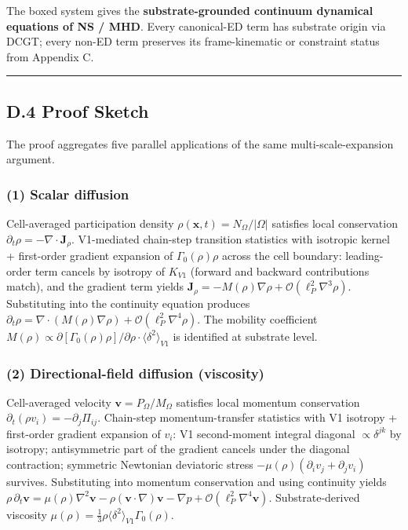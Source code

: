\documentclass[
  11pt,a4paper]{article}
\begin{document}
The boxed system gives the \textbf{substrate-grounded continuum
dynamical equations of NS / MHD}. Every canonical-ED term has substrate
origin via DCGT; every non-ED term preserves its frame-kinematic or
constraint status from Appendix C.

\begin{center}\rule{0.5\linewidth}{0.5pt}\end{center}

\subsection{D.4 Proof Sketch}\label{d.4-proof-sketch}

The proof aggregates five parallel applications of the same
multi-scale-expansion argument.

\subsubsection{(1) Scalar diffusion}\label{scalar-diffusion}

Cell-averaged participation density
\(\rho(\mathbf{x},t) = N_\Omega/|\Omega|\) satisfies local conservation
\(\partial_t\rho = -\nabla\cdot\mathbf{J}_\rho\). V1-mediated chain-step
transition statistics with isotropic kernel + first-order gradient
expansion of \(\Gamma_0(\rho)\rho\) across the cell boundary:
leading-order term cancels by isotropy of \(K_{V1}\) (forward and
backward contributions match), and the gradient term yields
\(\mathbf{J}_\rho = -M(\rho)\nabla\rho + \mathcal{O}(\ell_P^2\nabla^3\rho)\).
Substituting into the continuity equation produces
\(\partial_t\rho = \nabla\cdot(M(\rho)\nabla\rho) + \mathcal{O}(\ell_P^2\nabla^4\rho)\).
The mobility coefficient
\(M(\rho) \propto \partial[\Gamma_0(\rho)\rho]/\partial\rho \cdot \bigl\langle\delta^2\bigr\rangle_{V1}\)
is identified at substrate level.

\subsubsection{(2) Directional-field diffusion
(viscosity)}\label{directional-field-diffusion-viscosity}

Cell-averaged velocity \(\mathbf{v} = P_\Omega/M_\Omega\) satisfies
local momentum conservation
\(\partial_t(\rho v_i) = -\partial_j\Pi_{ij}\). Chain-step
momentum-transfer statistics with V1 isotropy + first-order gradient
expansion of \(v_i\): V1 second-moment integral diagonal
\(\propto\delta^{jk}\) by isotropy; antisymmetric part of the gradient
cancels under the diagonal contraction; symmetric Newtonian deviatoric
stress \(-\mu(\rho)(\partial_i v_j + \partial_j v_i)\) survives.
Substituting into momentum conservation and using continuity yields
\(\rho\,\partial_t\mathbf{v} = \mu(\rho)\nabla^2\mathbf{v} - \rho(\mathbf{v}\cdot\nabla)\mathbf{v} - \nabla p + \mathcal{O}(\ell_P^2\nabla^4\mathbf{v})\).
Substrate-derived viscosity
\(\mu(\rho) = \tfrac{1}{3}\rho\bigl\langle\delta^2\bigr\rangle_{V1}\Gamma_0(\rho)\).
\end{document}
